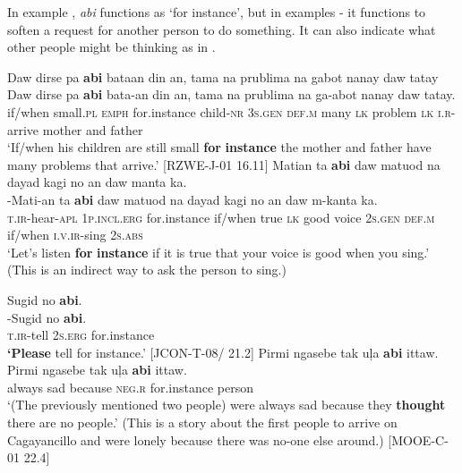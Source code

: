 In example , \textit{abi} functions as ‘for instance’, but in examples - it functions to soften a request for another person to do something. It can also indicate what other people might be thinking as in .

\ea
\label{bkm:Ref441345768}
Daw  dirse  pa  \textbf{abi}  bataan  din  an, tama  na  prublima  na  gabot  nanay  daw  tatay \\\smallskip
 \gll Daw  dirse  pa  \textbf{abi}  bata-an  din  an, tama  na  prublima  na  ga-abot  nanay  daw  tatay. \\
if/when  small.\textsc{pl}  \textsc{emph}  for.instance  child-\textsc{nr}  3\textsc{s.gen}  \textsc{def.m}
many  \textsc{lk}  problem  \textsc{lk}  \textsc{i.r}-arrive  mother  and  father \\
\glt `If/when his children are still small \textbf{for} \textbf{instance} the mother and father have many problems that arrive.’ [RZWE-J-01 16.11]
\z
\ea
\label{bkm:Ref441345813}
Matian  ta  \textbf{abi}  daw  matuod  na  dayad  kagi no  an  daw  manta  ka. \\\smallskip
 \gll \emptyset{}-Mati-an  ta  \textbf{abi}  daw  matuod  na  dayad  kagi no  an  daw  m-kanta  ka. \\
\textsc{t.ir}-hear-\textsc{apl}  1\textsc{p.incl.erg}  for.instance  if/when  true  \textsc{lk}  good  voice  2\textsc{s.gen}  \textsc{def.m}  if/when  \textsc{i.v.ir}-sing  2\textsc{s.abs} \\
\glt `Let’s listen \textbf{for} \textbf{instance} if it is true that your voice is good when you sing.’ (This is an indirect way to ask the person to sing.)
\z


\ea
\label{bkm:Ref441514069}
Sugid  no  \textbf{abi}. \\\smallskip
 \gll \emptyset{}-Sugid  no  \textbf{abi}. \\
\textsc{t.ir}-tell  2\textsc{s.erg}  for.instance \\
\glt \textbf{‘Please} tell for instance.' [JCON-T-08/ 21.2]
\z
\ea
\label{bkm:Ref441514118}
Pirmi  ngasebe  tak  uļa  \textbf{abi}  ittaw. \\\smallskip
 \gll Pirmi  ngasebe  tak  uļa  \textbf{abi}  ittaw. \\
always  sad  because  \textsc{neg.r}  for.instance  person \\
\glt ‘(The previously mentioned two people) were always sad because they \textbf{thought} there are no people.’ (This is a story about the first people to arrive on Cagayancillo and were lonely because there was no-one else around.) [MOOE-C-01 22.4] 
\z

